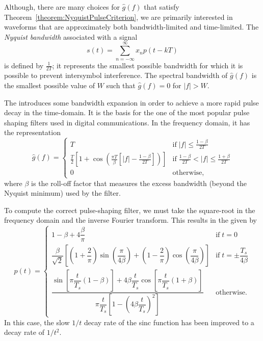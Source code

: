 Although, there are many choices for $\hat{g}(f)$ that satisfy Theorem~\ref{theorem:NyquistPulseCriterion}, we are primarily interested in waveforms that are approximately both bandwidth-limited and time-limited.
The \emph{Nyquist bandwidth} associated with a signal
\begin{equation*}
s(t) = \sum_{n=-\infty}^{\infty} x_n p(t -kT)
\end{equation*}
is defined by $\frac{1}{2T}$; it represents the smallest possible bandwidth for which it is possible to prevent intersymbol interference.
The spectral bandwidth of $\hat{g}(f)$ is the smallest possible value of $W$ such that $\hat{g}(f) = 0$ for $|f| > W$.

\begin{example}
The  introduces some bandwidth expansion in order to achieve a more rapid pulse decay in the time-domain.
It is the basis for the one of the most popular pulse shaping filters used in digital communications.
In the frequency domain, it has the representation
\begin{equation*}
\hat{g} (f) =
\begin{cases} T & \mathrm{if}\;|f| \leq \frac{1 - \beta}{2T} \\
 \frac{T}{2}\left[1 + \cos\left(\frac{\pi T}{\beta}\left[|f| - \frac{1 - \beta}{2T}\right]\right)\right] & \mathrm{if}\;\frac{1 - \beta}{2T} < |f| \leq \frac{1 + \beta}{2T} \\
 0 & \mathrm{otherwise},
\end{cases}
\end{equation*}
where $\beta$ is the roll-off factor that measures the excess bandwidth (beyond the Nyquist minimum) used by the filter.

To compute the correct pulse-shaping filter, we must take the square-root in the frequency domain and the inverse Fourier transform.
This results in the  given by
\begin{equation*}
p(t) =
\begin{cases}
1-\beta+4\dfrac{\beta}{\pi} & \mathrm{if}\; t = 0 \\
\dfrac{\beta}{\sqrt{2}}
\left[ \left(1+\dfrac{2}{\pi}\right)\sin\left(\dfrac{\pi}{4\beta}\right) + \left(1-\dfrac{2}{\pi}\right)\cos\left(\dfrac{\pi}{4\beta}\right) \right]
& \mathrm{if}\; t = \pm \dfrac{T_s}{4\beta} \\
\dfrac{\sin\left[\pi \dfrac{t}{T_s}\left(1-\beta\right)\right] + 4\beta\dfrac{t}{T_s}\cos\left[\pi\dfrac{t}{T_s}\left(1+\beta\right)\right]}{\pi \dfrac{t}{T_s}\left[1-\left(4\beta\dfrac{t}{T_s} \right)^2 \right]}
& \mathrm{otherwise}.
\end{cases}
\end{equation*}
In this case, the slow $1/t$ decay rate of the sinc function has been improved to a decay rate of $1/t^2$.
\end{example}


